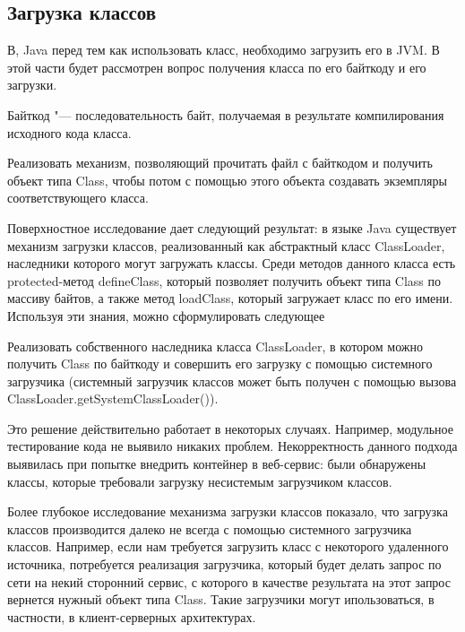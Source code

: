\subsection{Загрузка классов}

В, Java перед тем как использовать класс, необходимо загрузить его в JVM.
В этой части будет рассмотрен вопрос получения класса по его байткоду и его загрузки.

Байткод "--- последовательность байт, получаемая в результате компилирования исходного кода класса.

\begin{problem}
Реализовать механизм, позволяющий прочитать файл с байткодом и получить объект типа Class, чтобы потом с помощью этого объекта создавать экземпляры соответствующего класса.
\end{problem}
Поверхностное исследование дает следующий результат: в языке Java существует механизм загрузки классов, реализованный как абстрактный класс ClassLoader, наследники которого могут
загружать классы. Среди методов данного класса есть protected-метод defineClass, который позволяет получить объект типа Class по массиву байтов, а также метод loadClass, который 
загружает класс по его имени. Используя эти знания, можно сформулировать следующее

\begin{solution}
	Реализовать собственного наследника класса ClassLoader, в котором можно получить Class по байткоду и совершить его загрузку с помощью системного загрузчика
	(системный загрузчик классов может быть получен с помощью вызова ClassLoader.getSystemClassLoader()).
\end{solution}

Это решение действительно работает в некоторых случаях. Например, модульное тестирование кода не выявило никаких проблем. Некорректность данного подхода выявилась при попытке 
внедрить контейнер в веб-сервис: были обнаружены классы, которые требовали загрузку несистемым загрузчиком классов.

Более глубокое исследование механизма загрузки классов показало, что загрузка классов производится далеко не всегда с помощью системного загрузчика классов. Например, если нам требуется
загрузить класс с некоторого удаленного источника, потребуется реализация загрузчика, который будет делать запрос по сети на некий сторонний сервис, с которого в качестве 
результата на этот запрос вернется нужный объект типа Class. Такие загрузчики могут ипользоваться, в частности, в клиент-серверных архитектурах.

